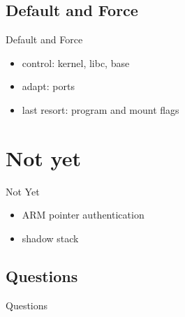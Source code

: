 \documentclass[14pt,aspectratio=169]{beamer}
\begin{document}
\subsection{Default and Force}
\begin{frame}{Default and Force}
\begin{itemize}
  \item control: kernel, libc, base
  \item adapt: ports
  \item last resort: program and mount flags
\end{itemize}
\end{frame}


\section{Not yet}
\begin{frame}{Not Yet}
\begin{itemize}
  \item ARM pointer authentication
  \item shadow stack
\end{itemize}
\end{frame}

\subsection{Questions}
\begin{frame}{Questions}
\begin{center}
\end{center}
\end{frame}
\end{document}

